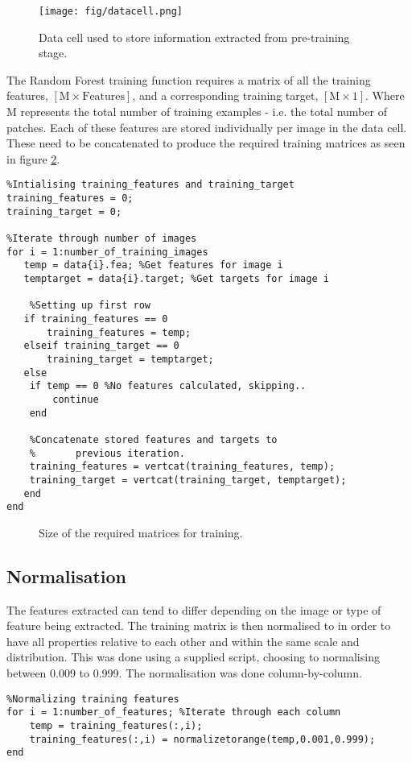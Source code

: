 \begin{figure}[H]
\centering
\texttt{[image: fig/datacell.png]}
\caption{Data cell used to store information extracted from pre-training stage.}
\label{mat:data}
\end{figure}

The Random Forest training function requires a matrix of all the training features, $[\textrm{M} \times \textrm{Features}]$, and a corresponding training target, $[\textrm{M}\times 1]$. Where M represents the total number of training examples - i.e. the total number of patches. Each of these features are stored individually per image in the data cell. These need to be concatenated to produce the required training matrices as seen in figure \ref{mat:trainmat}. 

\begin{lstlisting}
%Intialising training_features and training_target
training_features = 0;
training_target = 0;

%Iterate through number of images
for i = 1:number_of_training_images
   temp = data{i}.fea; %Get features for image i
   temptarget = data{i}.target; %Get targets for image i

	%Setting up first row   
   if training_features == 0
       training_features = temp;
   elseif training_target == 0
       training_target = temptarget;
   else
    if temp == 0 %No features calculated, skipping..
        continue
    end
    
    %Concatenate stored features and targets to 
    %		previous iteration.
    training_features = vertcat(training_features, temp);
    training_target = vertcat(training_target, temptarget);
   end
end
\end{lstlisting}


\begin{figure}[H]
    \centering
    \qquad
    \caption{Size of the required matrices for training.}%
    \label{mat:trainmat}
\end{figure}

\subsection{Normalisation}
The features extracted can tend to differ depending on the image or type of feature being extracted.  The training matrix is then normalised to in order to have all properties relative to each other and within the same scale and distribution.  This was done using a supplied script, choosing to normalising between 0.009 to 0.999. The normalisation was done column-by-column.
\\[1\baselineskip]
\begin{lstlisting}
%Normalizing training features 
for i = 1:number_of_features; %Iterate through each column
    temp = training_features(:,i);
    training_features(:,i) = normalizetorange(temp,0.001,0.999);
end
\end{lstlisting}

